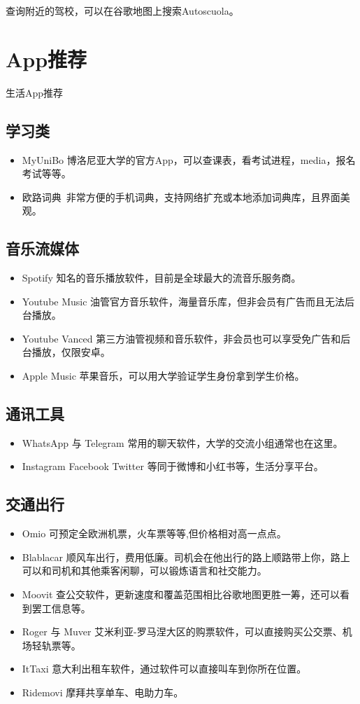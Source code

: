 查询附近的驾校，可以在谷歌地图上搜索Autoscuola。


\section{App推荐}
生活App推荐

\subsection{学习类}
\begin{itemize}
\item MyUniBo  博洛尼亚大学的官方App，可以查课表，看考试进程，media，报名考试等等。
\item 欧路词典\ 非常方便的手机词典，支持网络扩充或本地添加词典库，且界面美观。
\end{itemize}

\subsection{音乐流媒体}
\begin{itemize}
\item Spotify  知名的音乐播放软件，目前是全球最大的流音乐服务商。
\item Youtube Music  油管官方音乐软件，海量音乐库，但非会员有广告而且无法后台播放。
\item Youtube Vanced   第三方油管视频和音乐软件，非会员也可以享受免广告和后台播放，仅限安卓。
\item Apple Music  苹果音乐，可以用大学验证学生身份拿到学生价格。
\end{itemize}

\subsection{通讯工具}
\begin{itemize}
\item WhatsApp 与 Telegram  常用的聊天软件，大学的交流小组通常也在这里。
\item Instagram Facebook Twitter 等同于微博和小红书等，生活分享平台。
\end{itemize}

\subsection{交通出行}
\begin{itemize}
\item Omio  可预定全欧洲机票，火车票等等,但价格相对高一点点。 
\item Blablacar 顺风车出行，费用低廉。司机会在他出行的路上顺路带上你，路上可以和司机和其他乘客闲聊，可以锻炼语言和社交能力。
\item Moovit  查公交软件，更新速度和覆盖范围相比谷歌地图更胜一筹，还可以看到罢工信息等。
\item Roger 与 Muver  艾米利亚-罗马涅大区的购票软件，可以直接购买公交票、机场轻轨票等。
\item ItTaxi  意大利出租车软件，通过软件可以直接叫车到你所在位置。
\item Ridemovi  摩拜共享单车、电助力车。
\end{itemize}

